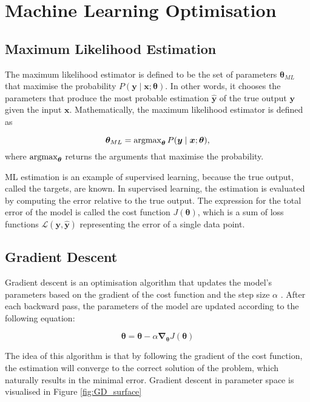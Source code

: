 \chapter{Machine Learning Optimisation}
\label{ch:optimisation}

\section{Maximum Likelihood Estimation}


The maximum likelihood estimator is defined to be the set of parameters $\bm{\theta}_{ML}$ that maximise the probability $P(\bm{y} \mid \bm{x}; \bm{\theta})$.
In other words, it chooses the parameters that produce the most probable estimation $\bm{\widehat{y}}$ of the true output $\bm{y}$ given the input $\bm{x}$.
Mathematically, the maximum likelihood estimator is defined as

\begin{equation}\label{eq:Max_likelihood}
    \bm{\theta}_{ML} = \operatorname{argmax}_{\bm{\theta}} P(\bm{y} \mid \bm{x}; \bm{\theta}),
\end{equation}
\noindent
where $\operatorname{argmax}_{\bm{\theta}}$ returns the arguments that maximise the probability.

ML estimation is an example of supervised learning, because the true output, called the targets, are known.
In supervised learning, the estimation is evaluated by computing the error relative to the true output.
The expression for the total error of the model is called the cost function $J(\bm{\theta})$,
which is a sum of loss functions $\mathcal{L}(\bm{y},\bm{\widehat{y}} )$ representing the error of a single data point.

\section{Gradient Descent}

Gradient descent is an optimisation algorithm that updates the model's parameters based on the gradient of the cost function and the step size $\alpha$ \cite{ruder2016overview}.
After each backward pass, the parameters of the model are updated according to the following equation:

\begin{equation}\label{eq:GD}
    \bm{\theta} = \bm{\theta} - \alpha \bm{\nabla_{\theta}} J(\bm{\theta})
\end{equation}

The idea of this algorithm is that by following the gradient of the cost function,
the estimation will converge to the correct solution of the problem,
which naturally results in the minimal error.
Gradient descent in parameter space is visualised in Figure \ref{fig:GD_surface}

